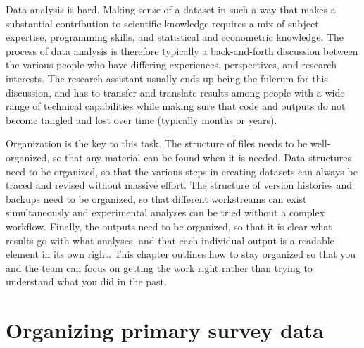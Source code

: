 
\begin{fullwidth}
Data analysis is hard. Making sense of a dataset in such a way
that makes a substantial contribution to scientific knowledge
requires a mix of subject expertise, programming skills,
and statistical and econometric knowledge.
The process of data analysis is therefore typically
a back-and-forth discussion between the various people
who have differing experiences, perspectives, and research interests.
The research assistant usually ends up being the fulcrum
for this discussion, and has to transfer and translate
results among people with a wide range of technical capabilities
while making sure that code and outputs do not become
tangled and lost over time (typically months or years).

Organization is the key to this task.
The structure of files needs to be well-organized,
so that any material can be found when it is needed.
Data structures need to be organized,
so that the various steps in creating datasets
can always be traced and revised without massive effort.
The structure of version histories and backups need to be organized,
so that different workstreams can exist simultaneously
and experimental analyses can be tried without a complex workflow.
Finally, the outputs need to be organized,
so that it is clear what results go with what analyses,
and that each individual output is a readable element in its own right.
This chapter outlines how to stay organized
so that you and the team can focus on getting the work right
rather than trying to understand what you did in the past.
\end{fullwidth}


\section{Organizing primary survey data}

